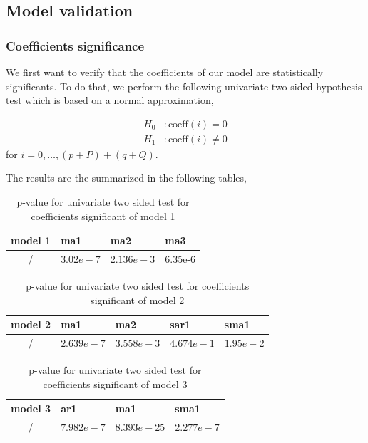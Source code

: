 \subsection{Model validation}

\subsubsection{Coefficients significance}

We first want to verify that the coefficients of our model are statistically significants. To do that, we perform the following univariate two sided hypothesis test which is based on a normal approximation,

\begin{align*}
	H_0&: \text{coeff}(i) = 0 \\
	H_1&: \text{coeff}(i) \neq 0
\end{align*}
for $i = 0,\dots,(p + P) + (q + Q)$.

The results are the summarized in the following tables,
\begin{table}[H]
	\centering
	\begin{tabular}{|c|l|l|l|}
		\hline
		\textbf{model 1}    & ma1			& ma2			& ma3 \\\hline
		    /				& $3.02e-7$ 	& $2.136e-3$ 	& 6.35e-6 \\\hline
	\end{tabular}
	\caption{p-value for univariate two sided test for coefficients significant of model 1}
	\label{tab:coefficients-significance-model1}
\end{table}

\begin{table}[H]
	\centering
	\begin{tabular}{|c|l|l|l|l|}
		\hline
		\textbf{model 2}    & ma1			& ma2			& sar1		 & sma1		 \\\hline
		    /				& $2.639e-7$ 	& $3.558e-3$ 	& $4.674e-1$ & $1.95e-2$ \\\hline
	\end{tabular}
	\caption{p-value for univariate two sided test for coefficients significant of model 2}
	\label{tab:coefficients-significance-model2}
\end{table}

\begin{table}[H]
	\centering
	\begin{tabular}{|c|l|l|l|}
		\hline
		\textbf{model 3}    & ar1			& ma1			& sma1 \\\hline
		    /				& $7.982e-7$ 	& $8.393e-25$ 	& $2.277e-7$ \\\hline
	\end{tabular}
	\caption{p-value for univariate two sided test for coefficients significant of model 3}
	\label{tab:coefficients-significance-model3}
\end{table}

